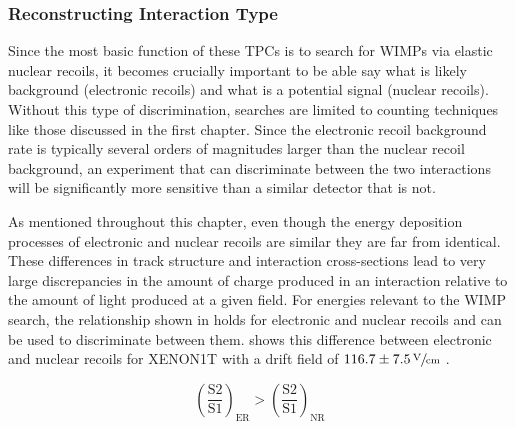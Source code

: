 \subsubsection{Reconstructing Interaction Type}

Since the most basic function of these TPCs is to search for WIMPs via elastic nuclear recoils, it becomes crucially important to be able say what is likely background (electronic recoils) and what is a potential signal (nuclear recoils).  Without this type of discrimination, searches are limited to counting techniques like those discussed in the first chapter.  Since the electronic recoil background rate is typically several orders of magnitudes larger than the nuclear recoil background, an experiment that can discriminate between the two interactions will be significantly more sensitive than a similar detector that is not.

As mentioned throughout this chapter, even though the energy deposition processes of electronic and nuclear recoils are similar they are far from identical.  These differences in track structure and interaction cross-sections lead to very large discrepancies in the amount of charge produced in an interaction relative to the amount of light produced at a given field.   For energies relevant to the WIMP search, the relationship shown in  holds for electronic and nuclear recoils and can be used to discriminate between them.   shows this difference between electronic and nuclear recoils for XENON1T with a drift field of $116.7 \pm 7.5  \,\sfrac{\textrm{V}}{\textrm{cm}}$ \cite{aprile2017first}.

\begin{equation}
        \label{eqn:lxe_disc}
        \left( \frac{\textrm{S2}}{\textrm{S1}} \right)_{\textrm{ER}} > \left( \frac{\textrm{S2}}{\textrm{S1}} \right)_{\textrm{NR}}
\end{equation}

